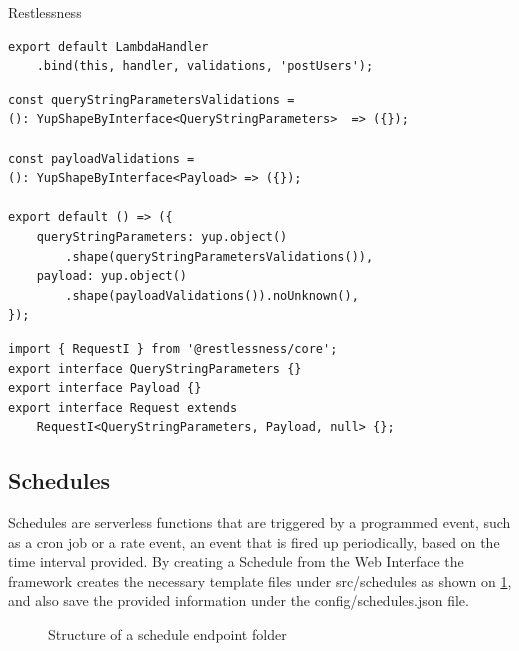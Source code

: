 \begin{chapter}{Restlessness}
    \begin{lstlisting}[caption=index.ts content, label={lst:index_ts}]
export default LambdaHandler
    .bind(this, handler, validations, 'postUsers');
    \end{lstlisting}

    \begin{lstlisting}[caption=validations.ts content, label={lst:validations_ts}]
const queryStringParametersValidations =
(): YupShapeByInterface<QueryStringParameters>  => ({});

const payloadValidations =
(): YupShapeByInterface<Payload> => ({});

export default () => ({
    queryStringParameters: yup.object()
        .shape(queryStringParametersValidations()),
    payload: yup.object()
        .shape(payloadValidations()).noUnknown(),
});
    \end{lstlisting}

    \begin{lstlisting}[caption=interfaces.ts content, label={lst:interfaces_ts}]
import { RequestI } from '@restlessness/core';
export interface QueryStringParameters {}
export interface Payload {}
export interface Request extends
    RequestI<QueryStringParameters, Payload, null> {};
    \end{lstlisting}

    \subsection{Schedules}
    \label{subsec:schedules}
    Schedules are serverless functions that are triggered by a programmed event,
    such as a cron job or a rate event, an event that is fired up periodically,
    based on the time interval provided.
    By creating a Schedule from the Web Interface the framework creates the necessary
    template files under src/schedules as shown on \ref{fig:new_schedule_folder_structure},
    and also save the provided information under the config/schedules.json file.

    \begin{figure}
        \caption{Structure of a schedule endpoint folder}
        \label{fig:new_schedule_folder_structure}
        \begin{minipage}{\linewidth}
        \end{minipage}
    \end{figure}


\end{chapter}

